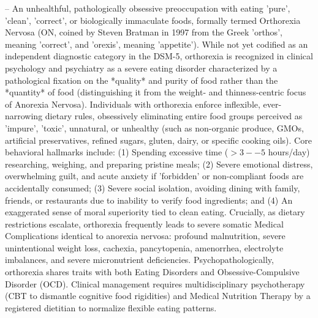 -- An unhealthful, pathologically obsessive preoccupation with eating 'pure', 'clean', 'correct', or biologically immaculate foods, formally termed Orthorexia Nervosa (ON, coined by Steven Bratman in 1997 from the Greek 'orthos', meaning 'correct', and 'orexis', meaning 'appetite'). While not yet codified as an independent diagnostic category in the DSM-5, orthorexia is recognized in clinical psychology and psychiatry as a severe eating disorder characterized by a pathological fixation on the *quality* and purity of food rather than the *quantity* of food (distinguishing it from the weight- and thinness-centric focus of Anorexia Nervosa). Individuals with orthorexia enforce inflexible, ever-narrowing dietary rules, obsessively eliminating entire food groups perceived as 'impure', 'toxic', unnatural, or unhealthy (such as non-organic produce, GMOs, artificial preservatives, refined sugars, gluten, dairy, or specific cooking oils). Core behavioral hallmarks include: (1) Spending excessive time ($>3--5$ hours/day) researching, weighing, and preparing pristine meals; (2) Severe emotional distress, overwhelming guilt, and acute anxiety if 'forbidden' or non-compliant foods are accidentally consumed; (3) Severe social isolation, avoiding dining with family, friends, or restaurants due to inability to verify food ingredients; and (4) An exaggerated sense of moral superiority tied to clean eating. Crucially, as dietary restrictions escalate, orthorexia frequently leads to severe somatic Medical Complications identical to anorexia nervosa: profound malnutrition, severe unintentional weight loss, cachexia, pancytopenia, amenorrhea, electrolyte imbalances, and severe micronutrient deficiencies. Psychopathologically, orthorexia shares traits with both Eating Disorders and Obsessive-Compulsive Disorder (OCD). Clinical management requires multidisciplinary psychotherapy (CBT to dismantle cognitive food rigidities) and Medical Nutrition Therapy by a registered dietitian to normalize flexible eating patterns.

